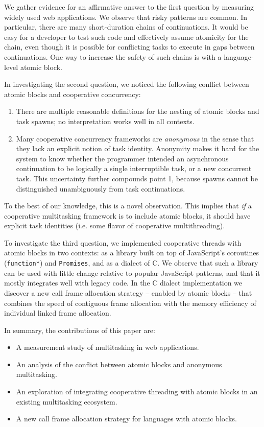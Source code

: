 \documentclass[acmsmall,anonymous,review]{acmart}\settopmatter{printfolios=true,printccs=false,printacmref=false}
\begin{document}
We gather evidence for an affirmative answer to the first question by measuring widely used web applications\footnotemark{}.
We observe that risky patterns are common.
In particular, there are many short-duration chains of continuations.
It would be easy for a developer to test such code and effectively assume atomicity for the chain, even though it is possible for conflicting tasks to execute in gaps between continuations.
One way to increase the safety of such chains is with a language-level atomic block.


In investigating the second question, we noticed the following conflict between atomic blocks and cooperative concurrency:
\begin{enumerate}
\item There are multiple reasonable definitions for the nesting of atomic blocks and task spawns; no interpretation works well in all contexts.
\item Many cooperative concurrency frameworks are \emph{anonymous} in the sense that they lack an explicit notion of task identity.
  Anonymity makes it hard for the system to know whether the programmer intended an asynchronous continuation to be logically a single interruptible task, or a new concurrent task.
  This uncertainty further compounds point 1, because spawns cannot be distinguished unambiguously from task continuations.
\end{enumerate}
To the best of our knowledge, this is a novel observation.
This implies that \emph{if} a cooperative multitasking framework is to include atomic blocks, it should have explicit task identities (i.e. some flavor of cooperative multithreading).

To investigate the third question, we implemented cooperative threads with atomic blocks in two contexts: as a library built on top of JavaScript's coroutines (\texttt{function*}) and \texttt{Promises}, and as a dialect of C.
We observe that such a library can be used with little change relative to popular JavaScript patterns, and that it mostly integrates well with legacy code.
In the C dialect implementation we discover a new call frame allocation strategy -- enabled by atomic blocks -- that combines the speed of contiguous frame allocation with the memory efficiency of individual linked frame allocation.

In summary, the contributions of this paper are:
\begin{itemize}
\item A measurement study of multitasking in web applications.
\item An analysis of the conflict between atomic blocks and anonymous multitasking.
\item An exploration of integrating cooperative threading with atomic blocks in an existing multitasking ecosystem.
\item A new call frame allocation strategy for languages with atomic blocks.
\end{itemize}
\end{document}
